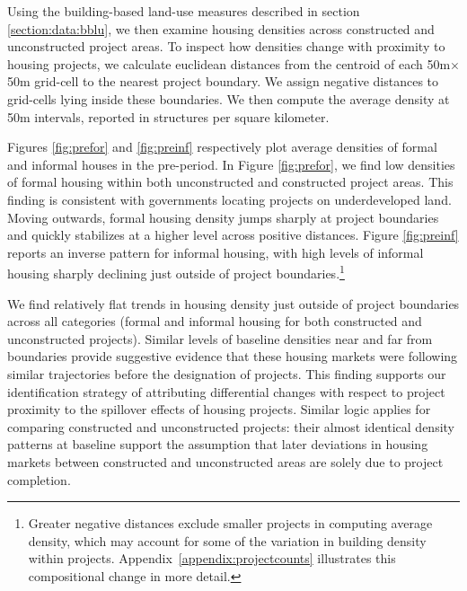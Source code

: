 \documentclass[12pt]{article}
\begin{document}
Using the building-based land-use measures described in section \ref{section:data:bblu}, we then examine housing densities across constructed and unconstructed project areas.  To inspect how densities change with proximity to housing projects, we calculate euclidean distances from the centroid of each 50m$\times$50m grid-cell to the nearest project boundary. We assign negative distances to grid-cells lying inside these boundaries.  We then compute the average density at 50m intervals, reported in structures per square kilometer.  

Figures \ref{fig:prefor} and \ref{fig:preinf} respectively plot average densities of formal and informal houses in the pre-period. In Figure \ref{fig:prefor}, we find low densities of formal housing within both unconstructed and constructed project areas. This finding is consistent with governments locating projects on underdeveloped land.  Moving outwards, formal housing density jumps sharply at project boundaries and quickly stabilizes at a higher level across positive distances.  Figure \ref{fig:preinf} reports an inverse pattern for informal housing, with high levels of informal housing sharply declining just outside of project boundaries.\footnote{Greater negative distances exclude smaller projects in computing average density, which may account for some of the variation in building density within projects.  Appendix~\ref{appendix:projectcounts} illustrates this compositional change in more detail.}

We find relatively flat trends in housing density just outside of project boundaries across all categories (formal and informal housing for both constructed and unconstructed projects).  
Similar levels of baseline densities near and far from boundaries provide suggestive evidence that these housing markets were following similar trajectories before the designation of projects.  This finding supports our identification strategy of attributing differential changes with respect to project proximity to the spillover effects of housing projects.  Similar logic applies for comparing constructed and unconstructed projects: their almost identical density patterns at baseline support the assumption that later deviations in housing markets between constructed and unconstructed areas are solely due to project completion.
\end{document}
